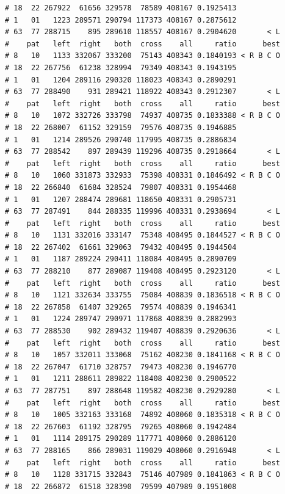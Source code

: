 \documentclass{article}\usepackage[]{graphicx}\usepackage[]{color}
\makeatletter
\newenvironment{kframe}{%
 \def\at@end@of@kframe{}%
 \ifinner\ifhmode%
  \def\at@end@of@kframe{\end{minipage}}%
  \begin{minipage}{\columnwidth}%
 \fi\fi%
 \def\FrameCommand##1{\hskip\@totalleftmargin \hskip-\fboxsep
 \colorbox{shadecolor}{##1}\hskip-\fboxsep
     \hskip-\linewidth \hskip-\@totalleftmargin \hskip\columnwidth}%
 \MakeFramed {\advance\hsize-\width
   \@totalleftmargin\z@ \linewidth\hsize
   \@setminipage}}%
 {\par\unskip\endMakeFramed%
 \at@end@of@kframe}
\newenvironment{knitrout}{}{} %
\makeatother
\begin{document}
\begin{knitrout}
\begin{kframe}
\begin{verbatim}
# 18  22 267922  61656 329578  78589 408167 0.1925413          
# 1   01   1223 289571 290794 117373 408167 0.2875612          
# 63  77 288715    895 289610 118557 408167 0.2904620       < L
#    pat   left  right   both  cross    all     ratio      best
# 8   10   1133 332067 333200  75143 408343 0.1840193 < R B C O
# 18  22 267756  61238 328994  79349 408343 0.1943195          
# 1   01   1204 289116 290320 118023 408343 0.2890291          
# 63  77 288490    931 289421 118922 408343 0.2912307       < L
#    pat   left  right   both  cross    all     ratio      best
# 8   10   1072 332726 333798  74937 408735 0.1833388 < R B C O
# 18  22 268007  61152 329159  79576 408735 0.1946885          
# 1   01   1214 289526 290740 117995 408735 0.2886834          
# 63  77 288542    897 289439 119296 408735 0.2918664       < L
#    pat   left  right   both  cross    all     ratio      best
# 8   10   1060 331873 332933  75398 408331 0.1846492 < R B C O
# 18  22 266840  61684 328524  79807 408331 0.1954468          
# 1   01   1207 288474 289681 118650 408331 0.2905731          
# 63  77 287491    844 288335 119996 408331 0.2938694       < L
#    pat   left  right   both  cross    all     ratio      best
# 8   10   1131 332016 333147  75348 408495 0.1844527 < R B C O
# 18  22 267402  61661 329063  79432 408495 0.1944504          
# 1   01   1187 289224 290411 118084 408495 0.2890709          
# 63  77 288210    877 289087 119408 408495 0.2923120       < L
#    pat   left  right   both  cross    all     ratio      best
# 8   10   1121 332634 333755  75084 408839 0.1836518 < R B C O
# 18  22 267858  61407 329265  79574 408839 0.1946341          
# 1   01   1224 289747 290971 117868 408839 0.2882993          
# 63  77 288530    902 289432 119407 408839 0.2920636       < L
#    pat   left  right   both  cross    all     ratio      best
# 8   10   1057 332011 333068  75162 408230 0.1841168 < R B C O
# 18  22 267047  61710 328757  79473 408230 0.1946770          
# 1   01   1211 288611 289822 118408 408230 0.2900522          
# 63  77 287751    897 288648 119582 408230 0.2929280       < L
#    pat   left  right   both  cross    all     ratio      best
# 8   10   1005 332163 333168  74892 408060 0.1835318 < R B C O
# 18  22 267603  61192 328795  79265 408060 0.1942484          
# 1   01   1114 289175 290289 117771 408060 0.2886120          
# 63  77 288165    866 289031 119029 408060 0.2916948       < L
#    pat   left  right   both  cross    all     ratio      best
# 8   10   1128 331715 332843  75146 407989 0.1841863 < R B C O
# 18  22 266872  61518 328390  79599 407989 0.1951008          

\end{verbatim}
\end{kframe}
\end{knitrout}
\end{document}
